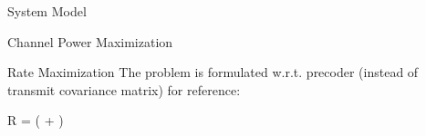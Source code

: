 \documentclass[journal]{IEEEtran}
\begin{document}
\begin{section}{System Model}
\begin{subsection}{Channel Power Maximization}

	\end{subsection}

	\begin{subsection}{Rate Maximization}
		The problem is formulated w.r.t. precoder (instead of transmit covariance matrix) for reference:
		\begin{maxi!}
			{}{R = \log \det \biggl( + \biggr)}{\label{op:pc_rate}}{\label{ob:pc_rate}}
		\end{maxi!}


\end{subsection}
\end{section}
\end{document}

